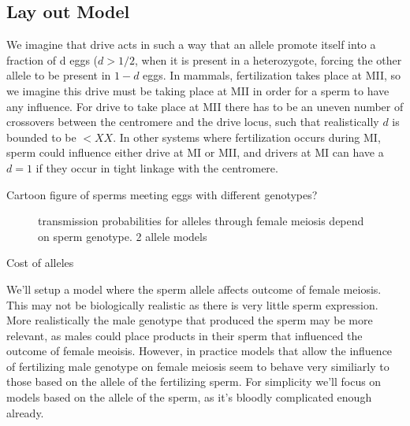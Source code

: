 \documentclass[12pt,letterpaper]{article}
\begin{document}
\subsection*{Lay out Model} 
We imagine that drive acts in such a way that an allele promote itself into a fraction of d
 eggs ($d> 1/2$, when it is present in a heterozygote, forcing the other allele to be present in $1-d$ eggs. 
In mammals, fertilization takes place at MII, so we imagine this drive must be taking place at MII in order
for a sperm to have any influence. For drive to take place at MII there has to be an uneven number of
 crossovers between the centromere and the drive locus, such that realistically $d$ is bounded to be $<XX$. 
In other systems where fertilization occurs during MI, sperm could influence either drive at MI or MII, 
and drivers at MI can have a $d=1$ if they occur in tight linkage with the centromere.

Cartoon figure of sperms meeting eggs with different genotypes? 

\begin{figure}
\caption{transmission probabilities for alleles through female
  meiosis depend on sperm genotype. 2 allele models}  
\label{Eggsperm_2_allele_cartoon}
\end{figure}

Cost of alleles

We'll setup a model where the sperm allele affects outcome of female meiosis. This may not be biologically
realistic as there is very little sperm expression. More realistically the male genotype that produced the sperm
may be more relevant, as males could place products in their sperm that influenced the outcome of female meoisis.
However, in practice models that allow the influence of fertilizing male genotype on female meiosis 
seem to behave very similiarly to those based on the allele of the fertilizing sperm.
For simplicity we'll focus on models based on the allele of the sperm, as it's bloodly complicated enough already.
\end{document}

